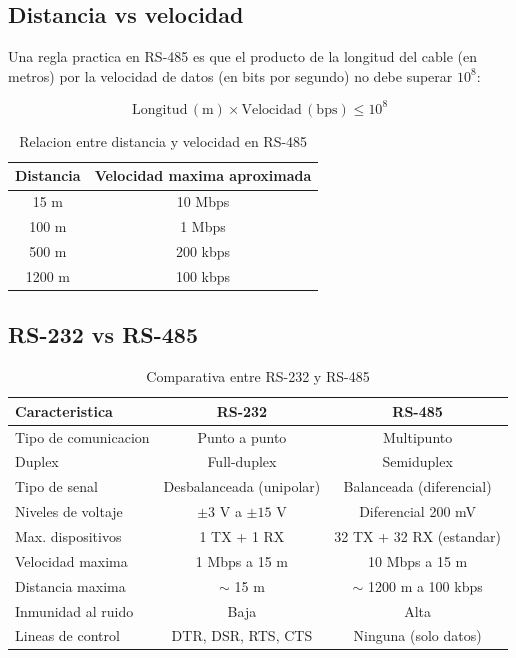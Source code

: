 \subsection{Distancia vs velocidad}

Una regla practica en RS-485 es que el producto de la longitud del cable (en
metros) por la velocidad de datos (en bits por segundo) no debe superar
$10^8$:

\begin{equation}
    \mathrm{Longitud\,(m)} \times \mathrm{Velocidad\,(bps)} \leq 10^8
\end{equation}

\begin{table}[H]
    \centering
    \caption{Relacion entre distancia y velocidad en RS-485}
    \label{tab:rs485_distancia}
    \begin{tabular}{|c|c|}
        \hline
        \textbf{Distancia} & \textbf{Velocidad maxima aproximada} \\
        \hline
        15 m & 10 Mbps \\
        \hline
        100 m & 1 Mbps \\
        \hline
        500 m & 200 kbps \\
        \hline
        1200 m & 100 kbps \\
        \hline
    \end{tabular}
\end{table}

\subsection{RS-232 vs RS-485}

\begin{table}[H]
    \centering
    \caption{Comparativa entre RS-232 y RS-485}
    \label{tab:rs232_vs_rs485}
    \begin{tabular}{|l|c|c|}
        \hline
        \textbf{Caracteristica} & \textbf{RS-232} & \textbf{RS-485} \\
        \hline
        Tipo de comunicacion & Punto a punto & Multipunto \\
        \hline
        Duplex & Full-duplex & Semiduplex \\
        \hline
        Tipo de senal & Desbalanceada (unipolar) & Balanceada (diferencial) \\
        \hline
        Niveles de voltaje & $\pm 3$ V a $\pm 15$ V & Diferencial 200 mV \\
        \hline
        Max. dispositivos & 1 TX + 1 RX & 32 TX + 32 RX (estandar) \\
        \hline
        Velocidad maxima & 1 Mbps a 15 m & 10 Mbps a 15 m \\
        \hline
        Distancia maxima & $\sim$ 15 m & $\sim$ 1200 m a 100 kbps \\
        \hline
        Inmunidad al ruido & Baja & Alta \\
        \hline
        Lineas de control & DTR, DSR, RTS, CTS & Ninguna (solo datos) \\
        \hline
    \end{tabular}
\end{table}


